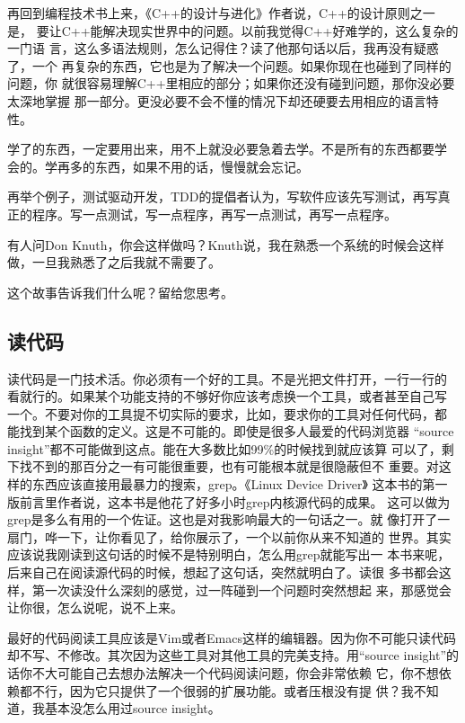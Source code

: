 \documentclass[10pt]{article}
\begin{document}
\begin{CJK*}{UTF8}{simsun}
再回到编程技术书上来，《C++的设计与进化》作者说，C++的设计原则之一是，
要让C++能解决现实世界中的问题。以前我觉得C++好难学的，这么复杂的一门语
言，这么多语法规则，怎么记得住？读了他那句话以后，我再没有疑惑了，一个
再复杂的东西，它也是为了解决一个问题。如果你现在也碰到了同样的问题，你
就很容易理解C++里相应的部分；如果你还没有碰到问题，那你没必要太深地掌握
那一部分。更没必要不会不懂的情况下却还硬要去用相应的语言特性。

学了的东西，一定要用出来，用不上就没必要急着去学。不是所有的东西都要学
会的。学再多的东西，如果不用的话，慢慢就会忘记。

再举个例子，测试驱动开发，TDD的提倡者认为，写软件应该先写测试，再写真
正的程序。写一点测试，写一点程序，再写一点测试，再写一点程序。

有人问Don Knuth，你会这样做吗？Knuth说，我在熟悉一个系统的时候会这样
做，一旦我熟悉了之后我就不需要了。

这个故事告诉我们什么呢？留给您思考。

\subsection{读代码}

读代码是一门技术活。你必须有一个好的工具。不是光把文件打开，一行一行的
看就行的。如果某个功能支持的不够好你应该考虑换一个工具，或者甚至自己写
一个。不要对你的工具提不切实际的要求，比如，要求你的工具对任何代码，都
能找到某个函数的定义。这是不可能的。即使是很多人最爱的代码浏览器
“source insight”都不可能做到这点。能在大多数比如99\%的时候找到就应该算
可以了，剩下找不到的那百分之一有可能很重要，也有可能根本就是很隐蔽但不
重要。对这样的东西应该直接用最暴力的搜索，grep。《Linux Device Driver》
这本书的第一版前言里作者说，这本书是他花了好多小时grep内核源代码的成果。
这可以做为grep是多么有用的一个佐证。这也是对我影响最大的一句话之一。就
像打开了一扇门，哗一下，让你看见了，给你展示了，一个以前你从来不知道的
世界。其实应该说我刚读到这句话的时候不是特别明白，怎么用grep就能写出一
本书来呢，后来自己在阅读源代码的时候，想起了这句话，突然就明白了。读很
多书都会这样，第一次读没什么深刻的感觉，过一阵碰到一个问题时突然想起
来，那感觉会让你很，怎么说呢，说不上来。

最好的代码阅读工具应该是Vim或者Emacs这样的编辑器。因为你不可能只读代码
却不写、不修改。其次因为这些工具对其他工具的完美支持。用“source
insight”的话你不大可能自己去想办法解决一个代码阅读问题，你会非常依赖
它，你不想依赖都不行，因为它只提供了一个很弱的扩展功能。或者压根没有提
供？我不知道，我基本没怎么用过source insight。


\end{CJK*}
\end{document}
